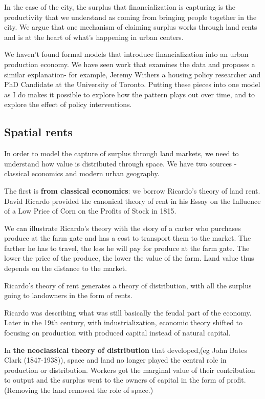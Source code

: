 \documentclass[]{article}
\begin{document}
In the case of the city, the surplus that financialization is capturing is the productivity that we understand as coming from bringing people together in the city. We argue that one mechanism of claiming surplus works through land rents and is at the heart of what’s happening in urban centers. 

We haven’t found formal models that introduce financialization into an urban production economy. We have seen work that examines the data and proposes a similar explanation- for example, Jeremy Withers a housing policy researcher and PhD Candidate at the University of Toronto. 
Putting these pieces into one model as I do makes it possible to explore how the pattern plays out over time, and to explore the effect of policy interventions.

\subsection{Spatial rents}
In order to model the capture of surplus through land markets, we need to understand how value is distributed through space. We have two sources - classical economics and modern urban geography.

The first is \textbf{from classical economics}: we borrow Ricardo's theory of land rent. David Ricardo provided the canonical theory of rent in his Essay on the Influence of a Low Price of Corn on the Profits of Stock in 1815.

We can illustrate Ricardo’s theory with the story of a carter who purchases produce at the farm gate and has a cost to transport them to the market. The farther he has to travel, the less he will pay for produce at the farm gate. The lower the price of the produce, the lower the value of the farm. Land value thus depends on the distance to the market.

Ricardo’s theory of rent generates a theory of distribution, with all the surplus going to landowners in the form of rents. 

Ricardo was describing what was still basically the feudal part of the economy. Later in the 19th century, with industrialization, economic theory shifted to focusing on production with produced capital instead of natural capital.

In \textbf{the neoclassical theory of distribution} that developed,(eg John Bates Clark (1847-1938)), space and land no longer played the central role in production or distribution. Workers got the marginal value of their contribution to output and the surplus went to the owners of capital in the form of profit.  (Removing the land removed the role of space.)
\end{document}
